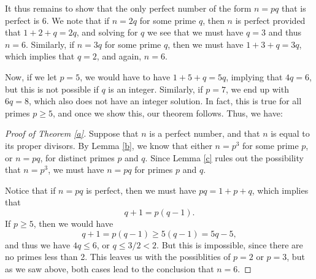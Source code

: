 \documentclass[letterpaper,12pt]{article}
\theoremstyle{definition}
\begin{document}
It thus remains to show that the only perfect number of the form $n=pq$ that is perfect is 6. We note that if $n=2q$ for some prime $q$, then $n$ is perfect provided that $1+2+q=2q$, and solving for $q$ we see that we must have $q=3$ and thus $n=6$. Similarly, if $n=3q$ for some prime $q$, then we must have $1+3+q=3q$, which implies that $q=2$, and again, $n=6$. 

Now, if we let $p=5$, we would have to have $1+5+q=5q$, implying that $4q=6$, but this is not possible if $q$ is an integer. Similarly, if $p=7$, we end up with $6q=8$, which also does not have an integer solution. In fact, this is true for all primes $p\geq 5$, and once we show this, our theorem follows. Thus, we have:
\begin{proof}[Proof of Theorem \ref{a}]
 Suppose that $n$ is a perfect number, and that $n$ is equal to its proper divisors. By Lemma \ref{b}, we know that either $n=p^3$ for some prime $p$, or $n=pq$, for distinct primes $p$ and $q$. Since Lemma \ref{c} rules out the possibility that $n=p^3$, we must have $n=pq$ for primes $p$ and $q$. 

 Notice that if $n=pq$ is perfect, then we must have $pq=1+p+q$, which implies that
\[
 q+1 = p(q-1).
\]
If $p\geq 5$, then we would have
\[
 q+1 = p(q-1)\geq 5(q-1) = 5q-5,
\]
and thus we have $4q\leq 6$, or $q\leq 3/2<2$. But this is impossible, since there are no primes less than 2. This leaves us with the possiblities of $p=2$ or $p=3$, but as we saw above, both cases lead to the conclusion that $n=6$.
\end{proof}
\end{document}
